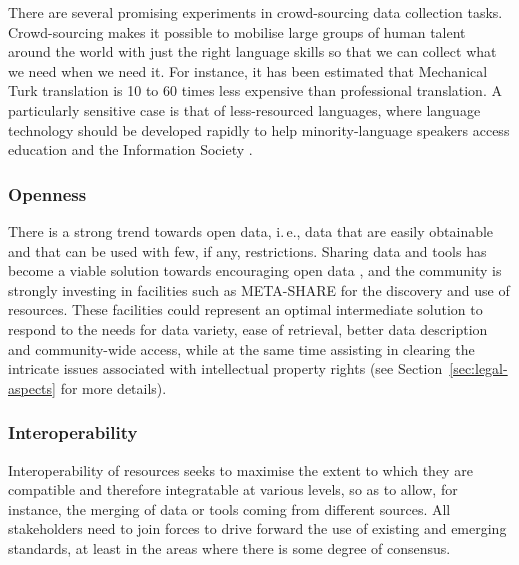 \documentclass[10pt, plain]{../../metanetpaper}
\begin{document}
\begin{multicols}{2}
There are several promising experiments in crowd-sourcing data collection tasks. Crowd-sourcing makes it possible to mobilise large groups of human talent around the world with just the right language skills so that we can collect what we need when we need it. For instance, it has been estimated that Mechanical Turk translation is 10 to 60 times less expensive than professional translation. A particularly sensitive case is that of less-resourced languages, where language technology should be developed rapidly to help minority-language speakers access education and the Information Society \cite{eldia12,maaya2012,ifa2008,ifa2011}. 

\subsubsection{Openness}
\label{sec:openness}

There is a strong trend towards open data, i.\,e., data that are easily obtainable and that can be used with few, if any, restrictions. Sharing data and tools has become a viable solution towards encouraging open data \cite{sellis2010}, and the community is strongly investing in facilities such as META-SHARE for the discovery and use of resources. These facilities could represent an optimal intermediate solution to respond to the needs for data variety, ease of retrieval, better data description and community-wide access, while at the same time assisting in clearing the intricate issues associated with intellectual property rights (see Section~\ref{sec:legal-aspects} for more details).

\subsubsection{Interoperability}
\label{sec:interoperability}

Interoperability of resources seeks to maximise the extent to which they are compatible and therefore integratable at various levels, so as to allow, for instance, the merging of data or tools coming from different sources. All stakeholders need to join forces to drive forward the use of existing and emerging standards, at least in the areas where there is some degree of consensus. 


\end{multicols}
\end{document}
